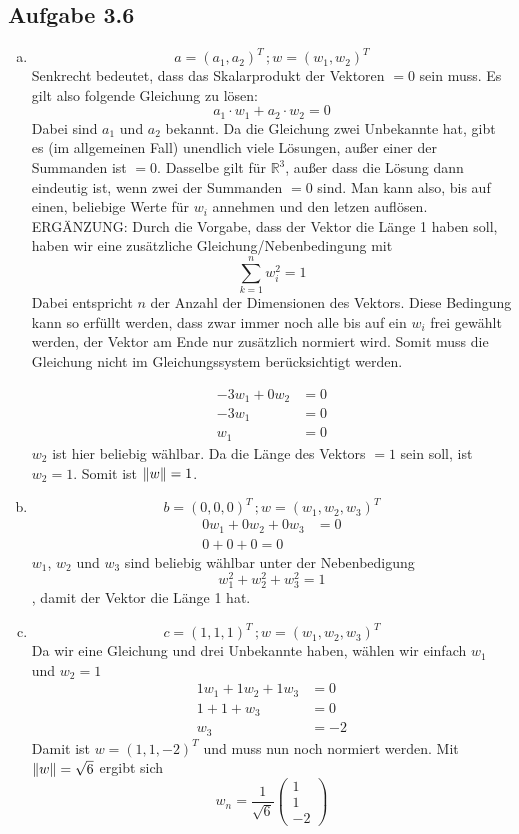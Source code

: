\documentclass{standalone}
\begin{document}
\subsection{Aufgabe 3.6}
\begin{enumerate}[a)]
    \item $$a=(a_1,a_2)^T \, ; w = (w_1, w_2)^T $$
    Senkrecht bedeutet, dass das Skalarprodukt der Vektoren $= 0$ sein muss. Es gilt also folgende Gleichung zu lösen:
    $$a_1 \cdot w_1 + a_2 \cdot w_2 = 0$$
    Dabei sind $a_1$ und $a_2$ bekannt. Da die Gleichung zwei Unbekannte hat, gibt es (im allgemeinen Fall) unendlich viele Lösungen, außer einer der Summanden ist $= 0$.
    Dasselbe gilt für $\mathbb{R}^3$, außer dass die Lösung dann eindeutig ist, wenn zwei der Summanden $= 0$ sind.
    Man kann also, bis auf einen, beliebige Werte für $w_i$ annehmen und den letzen auflösen.\\

    ERGÄNZUNG: Durch die Vorgabe, dass der Vektor die Länge 1 haben soll, haben wir eine zusätzliche Gleichung/Nebenbedingung mit
    $$\sum_{k=1}^{n}w_i^2=1$$
    Dabei entspricht $n$ der Anzahl der Dimensionen des Vektors. Diese Bedingung kann so erfüllt werden, dass zwar immer noch alle bis auf ein $w_i$ frei gewählt werden, der Vektor am Ende nur zusätzlich normiert wird. Somit muss die Gleichung nicht im Gleichungssystem berücksichtigt werden.
    
    \begin{align}
        -3 w_1 + 0 w_2 &= 0 \\
        -3w_1 &= 0 \\
        w_1 &=0
    \end{align}
    $w_2$ ist hier beliebig wählbar. Da die Länge des Vektors $=1$ sein soll, ist $w_2 = 1$. Somit ist $\left\lVert w\right\rVert = 1$.

    \item $$ b = (0,0,0)^T\, ; w = (w_1,w_2,w_3)^T $$
    \begin{align}
        0w_1 + 0w_2 + 0w_3 &= 0 \\
        0 + 0 + 0 = 0
    \end{align}
    $w_1$, $w_2$ und $w_3$ sind beliebig wählbar unter der Nebenbedigung
    $$w_1^2 +w_2^2+w_3^2=1$$, damit der Vektor die Länge 1 hat.

    \item $$ c = (1,1,1)^T \, ; w = (w_1,w_2,w_3)^T $$
    Da wir eine Gleichung und drei Unbekannte haben, wählen wir einfach $w_1$ und $w_2 = 1$ 
    \begin{align}
        1w_1 + 1w_2 + 1w_3 &= 0 \\
        1 + 1 + w_3 &= 0 \\
        w_3 &= -2
    \end{align}
    Damit ist $w = (1,1,-2)^T$ und muss nun noch normiert werden. Mit $\left\lVert w\right\rVert = \sqrt{6}$ ergibt sich 
    $$ w_n = \frac{1}{\sqrt{6}}\begin{pmatrix}
        1 \\ 1 \\ -2
    \end{pmatrix}$$


\end{enumerate}
\end{document}
